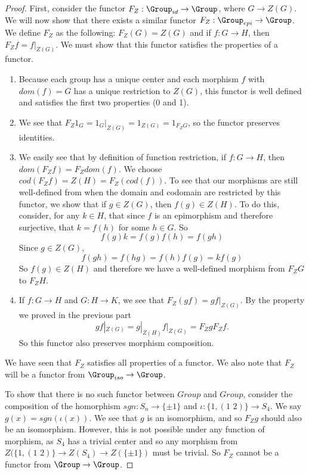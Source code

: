 \documentclass[main.tex]{subfiles}
\begin{document}
\begin{proof}


First, consider the functor $F_Z: \Group_{id}\rightarrow \Group$, where $G \rightarrow Z(G)$. We will now show that there exists a similar functor $F_Z: \Group_{epi} \rightarrow \Group$. We define $F_Z$ as the following: $F_Z(G) = Z(G)$ and if $f: G \rightarrow H$, then $F_{Z} f = f|_{Z(G)}$. We must show that this functor satisfies the properties of a functor.
\begin{enumerate}
    \item Because each group has a unique center and each morphism $f$ with $dom(f) = G$ has a unique restriction to $Z(G)$, this functor is well defined and satisfies the first two properties (0 and 1).
    \item We see that $F_{Z} 1_{G} = 1_{G}|_{Z(G)} = 1_{Z(G)} = 1_{F_{Z}G}$, so the functor preserves identities. 
    \item We easily see that by definition of function restriction, if $f: G \rightarrow H$, then $dom(F_{Z}f) = F_{Z}dom(f)$. We choose $cod(F_{Z}f) = Z(H) = F_Z(cod(f))$.  To see that our morphisms are still well-defined from when the domain and codomain are restricted by this functor, we show that if $g \in Z(G)$, then $f(g) \in Z(H)$. To do this, consider, for any $k \in H$, that since $f$ is an epimorphism and therefore surjective, that $k = f(h)$ for some $h \in G$. So \[f(g)k = f(g)f(h) = f(gh)\]Since $g \in Z(G)$, \[f(gh) = f(hg) = f(h)f(g) = kf(g)\] So $f(g) \in Z(H)$ and therefore we have a well-defined morphism from $F_ZG$ to $F_ZH$. 
    \item If $f:G \rightarrow H$ and $G: H \rightarrow K$, we see that $F_Z(gf) = gf|_{Z(G)}$. By the property we proved in the previous part \[gf|_{Z(G)} = g|_{Z(H)}f|_{Z(G)} = F_ZgF_Zf.\] So this functor also preserves morphism composition. 
\end{enumerate}

We have seen that $F_Z$ satisfies all properties of a functor. We also note that $F_Z$ will be a functor from $\Group_{iso} \rightarrow \Group$. 

To show that there is no such functor between $Group$ and $Group$, consider the 
composition of the homorphism $sgn: S_n \rightarrow \{ \pm 1 \} $ and $\iota: 
\{1, (1 \,\, 2) \} \rightarrow S_4$. We say $ g(x) = sgn(\iota(x))$. We see 
that $g$ is an isomorphism, and so $F_Zg$ should also be an isomorphism. 
However, this is not possible under any function of morphism, as $S_4$ has a 
trivial center and so any morphism from $Z(\{1, (1\,\,2)\} \rightarrow Z(S_4) 
\rightarrow Z(\{\pm 1\})$ must be trivial. So $F_Z$ cannot be a functor from 
$\Group \rightarrow \Group$.  


\end{proof}
\end{document}
